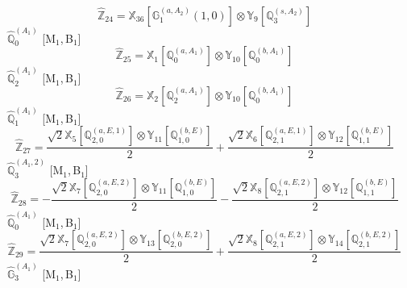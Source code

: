 \documentclass[fleqn,10pt,landscape]{article}
\begin{document}
\begin{itemize}
\begin{dmath*}
\hat{\mathbb{Z}}_{24}=\mathbb{X}_{36}[\mathbb{G}_{1}^{(a,A_{2})}(1,0)] \otimes\mathbb{Y}_{9}[\mathbb{Q}_{3}^{(s,A_{2})}]
\end{dmath*}
\vspace{4mm}
\noindent {} $\,\,\,\hat{\mathbb{Q}}_{0}^{(A_{1})}$ [M$_{1}$,\,B$_{1}$]
\begin{dmath*}
\hat{\mathbb{Z}}_{25}=\mathbb{X}_{1}[\mathbb{Q}_{0}^{(a,A_{1})}] \otimes\mathbb{Y}_{10}[\mathbb{Q}_{0}^{(b,A_{1})}]
\end{dmath*}
\vspace{4mm}
\noindent {} $\,\,\,\hat{\mathbb{Q}}_{2}^{(A_{1})}$ [M$_{1}$,\,B$_{1}$]
\begin{dmath*}
\hat{\mathbb{Z}}_{26}=\mathbb{X}_{2}[\mathbb{Q}_{2}^{(a,A_{1})}] \otimes\mathbb{Y}_{10}[\mathbb{Q}_{0}^{(b,A_{1})}]
\end{dmath*}
\vspace{4mm}
\noindent {} $\,\,\,\hat{\mathbb{Q}}_{1}^{(A_{1})}$ [M$_{1}$,\,B$_{1}$]
\begin{dmath*}
\hat{\mathbb{Z}}_{27}=\frac{\sqrt{2} \mathbb{X}_{5}[\mathbb{Q}_{2,0}^{(a,E,1)}] \otimes\mathbb{Y}_{11}[\mathbb{Q}_{1,0}^{(b,E)}]}{2} + \frac{\sqrt{2} \mathbb{X}_{6}[\mathbb{Q}_{2,1}^{(a,E,1)}] \otimes\mathbb{Y}_{12}[\mathbb{Q}_{1,1}^{(b,E)}]}{2}
\end{dmath*}
\vspace{4mm}
\noindent {} $\,\,\,\hat{\mathbb{Q}}_{3}^{(A_{1},2)}$ [M$_{1}$,\,B$_{1}$]
\begin{dmath*}
\hat{\mathbb{Z}}_{28}=- \frac{\sqrt{2} \mathbb{X}_{7}[\mathbb{Q}_{2,0}^{(a,E,2)}] \otimes\mathbb{Y}_{11}[\mathbb{Q}_{1,0}^{(b,E)}]}{2} - \frac{\sqrt{2} \mathbb{X}_{8}[\mathbb{Q}_{2,1}^{(a,E,2)}] \otimes\mathbb{Y}_{12}[\mathbb{Q}_{1,1}^{(b,E)}]}{2}
\end{dmath*}
\vspace{4mm}
\noindent {} $\,\,\,\hat{\mathbb{Q}}_{0}^{(A_{1})}$ [M$_{1}$,\,B$_{1}$]
\begin{dmath*}
\hat{\mathbb{Z}}_{29}=\frac{\sqrt{2} \mathbb{X}_{7}[\mathbb{Q}_{2,0}^{(a,E,2)}] \otimes\mathbb{Y}_{13}[\mathbb{Q}_{2,0}^{(b,E,2)}]}{2} + \frac{\sqrt{2} \mathbb{X}_{8}[\mathbb{Q}_{2,1}^{(a,E,2)}] \otimes\mathbb{Y}_{14}[\mathbb{Q}_{2,1}^{(b,E,2)}]}{2}
\end{dmath*}
\vspace{4mm}
\noindent {} $\,\,\,\hat{\mathbb{G}}_{3}^{(A_{1})}$ [M$_{1}$,\,B$_{1}$]
\begin{dmath*}

\end{dmath*}
\end{itemize}
\end{document}

